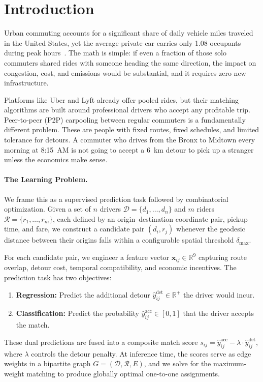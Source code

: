 \documentclass{article}
\begin{document}

\section{Introduction}
\label{sec:introduction}

Urban commuting accounts for a significant share of daily vehicle miles traveled in the United States, yet the average private car carries only 1.08 occupants during peak hours~\citep{santos2011summary}. The math is simple: if even a fraction of those solo commuters shared rides with someone heading the same direction, the impact on congestion, cost, and emissions would be substantial, and it requires zero new infrastructure.

Platforms like Uber and Lyft already offer pooled rides, but their matching algorithms are built around professional drivers who accept any profitable trip. Peer-to-peer (P2P) carpooling between regular commuters is a fundamentally different problem. These are people with fixed routes, fixed schedules, and limited tolerance for detours. A commuter who drives from the Bronx to Midtown every morning at 8:15~AM is not going to accept a 6~km detour to pick up a stranger unless the economics make sense.

\paragraph{The Learning Problem.}
We frame this as a supervised prediction task followed by combinatorial optimization. Given a set of $n$ drivers $\mathcal{D} = \{d_1, \ldots, d_n\}$ and $m$ riders $\mathcal{R} = \{r_1, \ldots, r_m\}$, each defined by an origin--destination coordinate pair, pickup time, and fare, we construct a candidate pair $(d_i, r_j)$ whenever the geodesic distance between their origins falls within a configurable spatial threshold $\delta_{\text{max}}$.

For each candidate pair, we engineer a feature vector $\mathbf{x}_{ij} \in \mathbb{R}^9$ capturing route overlap, detour cost, temporal compatibility, and economic incentives. The prediction task has two objectives:
\begin{enumerate}
    \item \textbf{Regression:} Predict the additional detour $\hat{y}^{\text{det}}_{ij} \in \mathbb{R}^+$ the driver would incur.
    \item \textbf{Classification:} Predict the probability $\hat{y}^{\text{acc}}_{ij} \in [0, 1]$ that the driver accepts the match.
\end{enumerate}
These dual predictions are fused into a composite match score $s_{ij} = \hat{y}^{\text{acc}}_{ij} - \lambda \cdot \hat{y}^{\text{det}}_{ij}$, where $\lambda$ controls the detour penalty. At inference time, the scores serve as edge weights in a bipartite graph $G = (\mathcal{D}, \mathcal{R}, E)$, and we solve for the maximum-weight matching to produce globally optimal one-to-one assignments.
\end{document}
